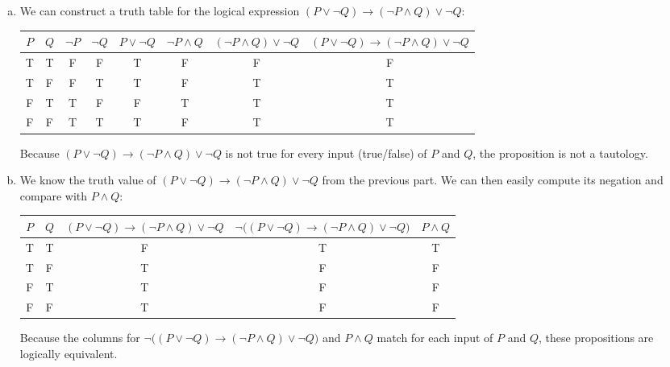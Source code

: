 \documentclass[11pt,letterpaper]{article}
\begin{document}
\sol
\begin{enumerate}[(a)]
\item We can construct a truth table for the logical expression $(P \vee \neg Q) \to (\neg P \wedge Q) \vee \neg Q$: \par
	\begin{table}[!ht]
	\centering
	\begin{tabular}{cc||ccccc|c}
	$P$ & $Q$ & $\neg P$ & $\neg Q$ & $P \vee \neg Q$ & $\neg P \wedge Q$ & $ (\neg P \wedge Q) \vee \neg Q$ & $(P \vee \neg Q) \to (\neg P \wedge Q) \vee \neg Q$ \\ \hline
	T & T & F & F & T & F & F & F \\
	T & F & F & T & T & F & T & T \\
	F & T & T & F & F & T & T & T \\
	F & F & T & T & T & F & T & T
	\end{tabular}
	\end{table} \par
Because $(P \vee \neg Q) \to (\neg P \wedge Q) \vee \neg Q$ is not true for every input (true/false) of $P$ and $Q$, the proposition is not a tautology. \pspace

\item We know the truth value of $(P \vee \neg Q) \to (\neg P \wedge Q) \vee \neg Q$ from the previous part. We can then easily compute its negation and compare with $P \wedge Q$: \par
	\begin{table}[!ht]
	\centering
	\begin{tabular}{c|c||c|c|c}
	$P$ & $Q$ & $(P \vee \neg Q) \to (\neg P \wedge Q) \vee \neg Q$ & $\neg \big( (P \vee \neg Q) \to (\neg P \wedge Q) \vee \neg Q \big)$ & $P \wedge Q$ \\ \hline
	T & T & F & T & T \\
	T & F & T & F & F \\
	F & T & T & F & F \\
	F & F & T & F & F
	\end{tabular}
	\end{table} \par
Because the columns for $\neg \big( (P \vee \neg Q) \to (\neg P \wedge Q) \vee \neg Q \big)$ and $P \wedge Q$ match for each input of $P$ and $Q$, these propositions are logically equivalent. \pspace


\end{enumerate}
\end{document}
